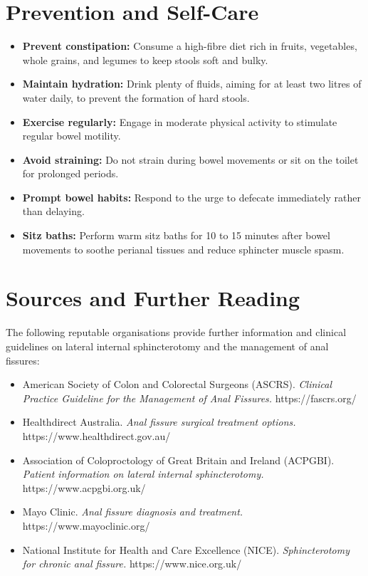 \section*{Prevention and Self-Care}
\begin{itemize}
    \item \textbf{Prevent constipation:} Consume a high-fibre diet rich in fruits, vegetables, whole grains, and legumes to keep stools soft and bulky.
    \item \textbf{Maintain hydration:} Drink plenty of fluids, aiming for at least two litres of water daily, to prevent the formation of hard stools.
    \item \textbf{Exercise regularly:} Engage in moderate physical activity to stimulate regular bowel motility.
    \item \textbf{Avoid straining:} Do not strain during bowel movements or sit on the toilet for prolonged periods.
    \item \textbf{Prompt bowel habits:} Respond to the urge to defecate immediately rather than delaying.
    \item \textbf{Sitz baths:} Perform warm sitz baths for 10 to 15 minutes after bowel movements to soothe perianal tissues and reduce sphincter muscle spasm.
\end{itemize}

\section*{Sources and Further Reading}
The following reputable organisations provide further information and clinical guidelines on lateral internal sphincterotomy and the management of anal fissures:
\begin{itemize}
    \item American Society of Colon and Colorectal Surgeons (ASCRS). \textit{Clinical Practice Guideline for the Management of Anal Fissures.} https://fascrs.org/
    \item Healthdirect Australia. \textit{Anal fissure surgical treatment options.} https://www.healthdirect.gov.au/
    \item Association of Coloproctology of Great Britain and Ireland (ACPGBI). \textit{Patient information on lateral internal sphincterotomy.} https://www.acpgbi.org.uk/
    \item Mayo Clinic. \textit{Anal fissure diagnosis and treatment.} https://www.mayoclinic.org/
    \item National Institute for Health and Care Excellence (NICE). \textit{Sphincterotomy for chronic anal fissure.} https://www.nice.org.uk/
\end{itemize}
